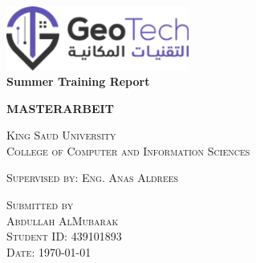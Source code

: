 \begin{titlepage}
\begin{singlespace}


\setlength{\hoffset}{-5mm} 
\setlength{\voffset}{-15mm}

\begin{center}

\includegraphics[width=6cm]{images/logo.png}\\

\vspace{1.5cm}
\LARGE
\textbf{Summer Training Report}\\

\vspace{1.5cm}

\large
\textbf{MASTERARBEIT}\\
\vspace{1.5cm}

\large
\textsc{
King Saud University\\
College of Computer and Information Sciences}\\

\vspace{1.5cm}

\textsc{Supervised by: Eng. Anas Aldrees}\\
\smallskip


\vspace{1cm}
\textsc{Submitted by\\
Abdullah AlMubarak\\
Student ID: 439101893}\\

\vspace{1cm}
\textsc{Date: \today}\\ %

\end{center}

\clearpage
\setlength{\hoffset}{0mm}
\end{singlespace}
\end{titlepage}
